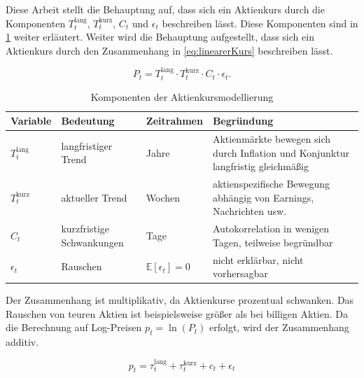 Diese Arbeit stellt die Behauptung auf, dass sich ein Aktienkurs durch die Komponenten $T_t^{\text{lang}}$, $T_t^{\text{kurz}}$, $C_t$ und $\epsilon_t$ beschreiben lässt. Diese Komponenten sind in \cref{tab:stock_components} weiter erläutert. Weiter wird die Behauptung aufgestellt, dass sich ein Aktienkurs durch den Zusammenhang in \cref{eq:linearerKurs} beschreiben lässt.

\begin{equation}
    \label{eq:linearerKurs}
    P_t = T_t^{\text{lang}} \cdot T_t^{\text{kurz}} \cdot C_t \cdot \epsilon_t.
\end{equation}

\begin{table}[h]
    \centering
    \begin{tabularx}{\textwidth}{lllX}
        \toprule
        \textbf{Variable}   & \textbf{Bedeutung}        & \textbf{Zeitrahmen}          & \textbf{Begründung}                                                              \\
        \midrule
        $T_t^{\text{lang}}$ & langfristiger Trend       & Jahre                        & Aktienmärkte bewegen sich durch Inflation und Konjunktur langfristig gleichmäßig \\
        \addlinespace
        $T_t^{\text{kurz}}$ & aktueller Trend           & Wochen                       & aktienspezifische Bewegung abhängig von Earnings, Nachrichten usw.               \\
        \addlinespace
        $C_t$               & kurzfristige Schwankungen & Tage                         & Autokorrelation in wenigen Tagen, teilweise begründbar                           \\
        \addlinespace
        $\epsilon_t$        & Rauschen                  & $\mathbb{E}[\epsilon_t] = 0$ & nicht erklärbar, nicht vorhersagbar                                              \\
        \bottomrule
    \end{tabularx}
    \caption{Komponenten der Aktienkursmodellierung}\label{tab:stock_components}
\end{table}

Der Zusammenhang ist multiplikativ, da Aktienkurse prozentual schwanken. Das Rauschen von teuren Aktien ist beispielsweise größer als bei billigen Aktien. Da die Berechnung auf Log-Preisen $p_t = \ln(P_t)$ erfolgt, wird der Zusammenhang additiv.

\begin{equation}
    \label{eq:lineareRenditen}
    p_t = \tau_t^{\text{lang}} + \tau_t^{\text{kurz}} + c_t + \epsilon_t
\end{equation}

